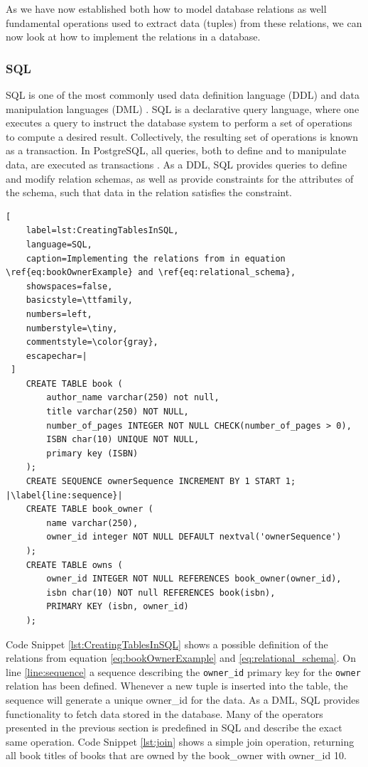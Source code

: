 As we have now established both how to model database relations as well fundamental operations used to extract data (tuples) from these relations, we can now look at how to implement the relations in a database.

\subsubsection{SQL}\label{sec:SQL}
SQL is one of the most commonly used data definition language (DDL) and data manipulation languages (DML) \cite[Chapter 3.1]{DBSBook}.
SQL is a declarative query language, where one executes a query to instruct the database system to perform a set of operations to compute a desired result. 
Collectively, the resulting set of operations is known as a transaction.
In PostgreSQL, all queries, both to define and to manipulate data, are executed as transactions \cite{postgres_transactions}.
As a DDL, SQL provides queries to define and modify relation schemas, as well as provide constraints for the attributes of the schema, such that data in the relation satisfies the constraint.  

\begin{lstlisting}[
    label=lst:CreatingTablesInSQL,
    language=SQL,
    caption=Implementing the relations from in equation \ref{eq:bookOwnerExample} and \ref{eq:relational_schema},
    showspaces=false,
    basicstyle=\ttfamily,
    numbers=left,
    numberstyle=\tiny,
    commentstyle=\color{gray},
    escapechar=|
 ]
    CREATE TABLE book (
        author_name varchar(250) not null,
        title varchar(250) NOT NULL,
        number_of_pages INTEGER NOT NULL CHECK(number_of_pages > 0),
        ISBN char(10) UNIQUE NOT NULL,
        primary key (ISBN)
    );
    CREATE SEQUENCE ownerSequence INCREMENT BY 1 START 1; |\label{line:sequence}|
    CREATE TABLE book_owner (
        name varchar(250),
        owner_id integer NOT NULL DEFAULT nextval('ownerSequence')
    );
    CREATE TABLE owns (
        owner_id INTEGER NOT NULL REFERENCES book_owner(owner_id),
        isbn char(10) NOT null REFERENCES book(isbn),
        PRIMARY KEY (isbn, owner_id)
    );
\end{lstlisting}

Code Snippet \ref{lst:CreatingTablesInSQL} shows a possible definition of the relations from equation \ref{eq:bookOwnerExample} and \ref{eq:relational_schema}.
On line \ref{line:sequence} a sequence describing the \texttt{owner\_id} primary key for the \texttt{owner} relation has been defined.
Whenever a new tuple is inserted into the table, the sequence will generate a unique owner\_id for the data.
As a DML, SQL provides functionality to fetch data stored in the database. 
Many of the operators presented in the previous section is predefined in SQL and describe the exact same operation. 
Code Snippet \ref{lst:join} shows a simple join operation, returning all book titles of books that are owned by the book\_owner with owner\_id 10.

